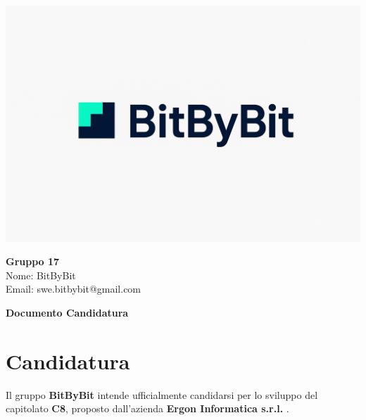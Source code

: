 \documentclass[a4paper,12pt]{article}
\begin{document}
\begin{center}
    \begin{minipage}{0.25\textwidth}
        \centering
        \includegraphics[width=\linewidth]{logo.png}
    \end{minipage}
    \hfill
    \begin{minipage}{0.7\textwidth}
        \raggedright
        {\LARGE \textbf{Gruppo 17}}\\[0.3cm]
        {\large
        Nome: BitByBit\\
        Email: swe.bitbybit@gmail.com
        }
    \end{minipage}
\end{center}

\vspace{1.5cm}

\begin{center}
    {\LARGE \textbf{Documento Candidatura}}
\end{center}

\vspace*{\fill} %

\clearpage

\clearpage
\tableofcontents
\thispagestyle{empty} %
\clearpage

\section{Candidatura}

Il gruppo \textbf{BitByBit} intende ufficialmente candidarsi per lo sviluppo del capitolato \textbf{C8}, proposto dall’azienda \textbf{Ergon Informatica s.r.l.} .
\end{document}
